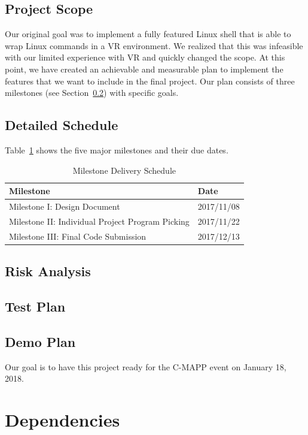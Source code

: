 \documentclass[titlepage,12pt]{article}
\begin{document}
\subsection{Project Scope}
Our original goal was to implement a fully featured Linux shell that is able to
wrap Linux commands in a VR environment. We realized that this was infeasible
with our limited experience with VR and quickly changed the scope. At this
point, we have created an achievable and measurable plan to implement the
features that we want to include in the final project. Our plan consists of
three milestones (see Section~\ref{sec:schedule}) with specific goals.

\subsection{Detailed Schedule}\label{sec:schedule}
Table~\ref{tab:milestones} shows the five major milestones and their due dates.
\begin{table}[H]
    \caption{Milestone Delivery Schedule}\label{tab:milestones}
    \centering
    \begin{tabular}{|l|l|}
        \hline
        \textbf{Milestone} & \textbf{Date} \\
        \hline\hline
        Milestone I: Design Document & 2017/11/08 \\
        \hline
        Milestone II: Individual Project Program Picking & 2017/11/22 \\
        \hline
        Milestone III: Final Code Submission & 2017/12/13 \\
        \hline
    \end{tabular}
\end{table}

\subsection{Risk Analysis}

\subsection{Test Plan}

\subsection{Demo Plan}
Our goal is to have this project ready for the C-MAPP event on January 18, 2018.

\section{Dependencies}
\end{document}
